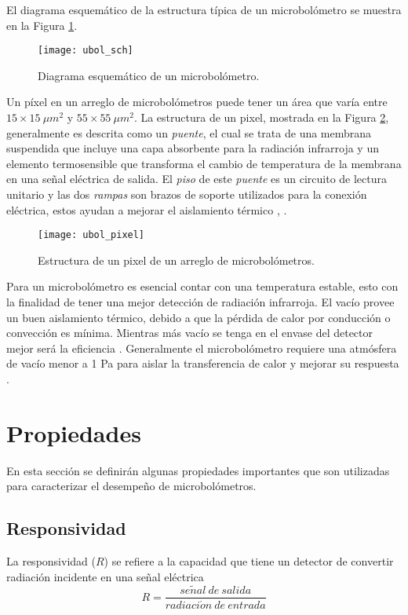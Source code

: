 El diagrama esquemático de la estructura típica de un microbolómetro se muestra en la Figura \ref{fig:ubol_sch}.
            \begin{figure}[hbtp]
                \centering
                \texttt{[image: ubol\_sch]}
                \caption{Diagrama esquemático de un microbolómetro.}
                \label{fig:ubol_sch}
            \end{figure}
\newpage
Un píxel en un arreglo de microbolómetros puede tener un área que varía entre $15\times 15\ \mu m^{2}$ y $55\times 55\ \mu m^{2}$. La estructura de un pixel, mostrada en la Figura \ref{fig:ubol_pixel}, generalmente es descrita como un \textit{puente}, el cual se trata de una membrana suspendida que incluye una capa absorbente para la radiación infrarroja y un elemento termosensible que transforma el cambio de temperatura de la membrana en una señal eléctrica de salida. El \textit{piso} de este \textit{puente} es un circuito de lectura unitario y las dos \textit{rampas} son brazos de soporte utilizados para la conexión eléctrica, estos ayudan a mejorar el aislamiento térmico \cite{Vincent}, \cite{Budzier}.

            \begin{figure}[hbtp]
                \centering
                \texttt{[image: ubol\_pixel]}
                \caption{Estructura de un pixel de un arreglo de microbolómetros.}
                \label{fig:ubol_pixel}
            \end{figure}

Para un microbolómetro es esencial contar con una temperatura estable, esto con la finalidad de tener una mejor detección de radiación infrarroja. El vacío provee un buen aislamiento térmico, debido a que la pérdida de calor por conducción o convección es mínima. Mientras más vacío se tenga en el envase del detector mejor será la eficiencia \cite{Lau2010}.
Generalmente el microbolómetro requiere una atmósfera de vacío menor a 1 Pa para aislar la transferencia de calor y mejorar su respuesta \cite{Liu2020}.


    \section{Propiedades}
    En esta sección se definirán algunas propiedades importantes que son utilizadas para caracterizar el desempeño de microbolómetros.
        \subsection{Responsividad}
        La responsividad ($R$) se refiere a la capacidad que tiene un detector de convertir radiación incidente en una señal eléctrica
        \begin{equation}
        R = \frac{se\tilde{n}al\ de\ salida}{radiaci\acute{o}n\ de\ entrada}
        \label{eq:Responsivity}
        \end{equation}
        
